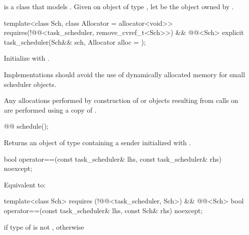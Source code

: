 \pnum
{} is a class that models
.
Given on object  of type , let
 be the object owned by .

\begin{itemdecl}
template<class Sch, class Allocator = allocator<void>>
  requires(!@@<task_scheduler, remove_cvref_t<Sch>>) && @@<Sch>
explicit task_scheduler(Sch&& sch, Allocator alloc = {});
\end{itemdecl}
\begin{itemdescr}
\pnum
\effects
Initialize  with
.

\pnum
\recommended
Implementations should avoid the use of dynamically
allocated memory for small scheduler objects.

\pnum
\remarks
Any allocations performed by construction of  or
 objects resulting from calls on  are
performed using a copy of .
\end{itemdescr}

%
\begin{itemdecl}
@@ schedule();
\end{itemdecl}
\begin{itemdescr}
\pnum
\effects
Returns an object of type  containing a sender
initialized with .
\end{itemdescr}

%
\begin{itemdecl}
bool operator==(const task_scheduler& lhs, const task_scheduler& rhs) noexcept;
\end{itemdecl}
\begin{itemdescr}
\pnum
\effects
Equivalent to: 
\end{itemdescr}

%
\begin{itemdecl}
template<class Sch>
  requires (!@@<task_scheduler, Sch>)
        && @@<Sch>
bool operator==(const task_scheduler& lhs, const Sch& rhs) noexcept;
\end{itemdecl}
\begin{itemdescr}
\pnum
\returns
{} if type of  is not ,
otherwise 
\end{itemdescr}

